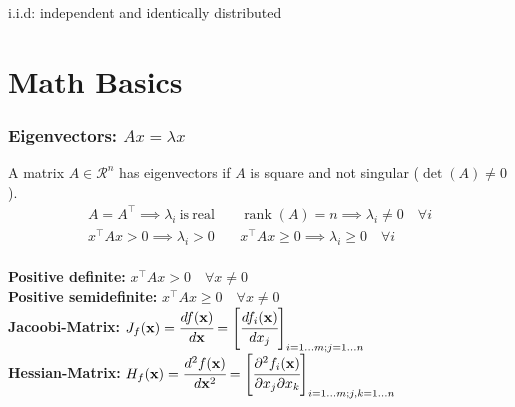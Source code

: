 \begin{mdframed}[style=redbox]
  i.i.d: independent and identically distributed
\end{mdframed}

\section{Math Basics}
\begin{mdframed}[style=eqbox]
\subsubsection*{Eigenvectors: \(A x = \lambda x\)}
A matrix $A \in \mathcal R^n$ has eigenvectors if $A$ is square and not singular (\(\det (A) \neq 0\)).
\vspace*{-4pt}\begin{align*}
  A = A^\top \implies \lambda_i \mathrm{~is~real~} && \operatorname*{rank}(A) = n \implies \lambda_i \neq 0 \quad \forall i\\
  x^\top A x > 0 \implies \lambda_i > 0 && x^\top A x \geq 0 \implies \lambda_i \geq 0 \quad \forall i
\end{align*}\vspace*{-16pt}\\
\textbf{Positive definite:} \(x^\top A x > 0 \quad \forall x \neq 0\)\\
\textbf{Positive semidefinite:} \(x^\top A x \geq 0 \quad \forall x \neq 0\)\\
\textbf{Jacoobi-Matrix:} \(J_f(\mathbf x) = \cfrac{d f(\mathbf x)}{d\mathbf x} = \left[\cfrac{df_i(\mathbf x)}{dx_j}\right]_{i = 1\dots m; j = 1\dots n}\)\\
\textbf{Hessian-Matrix:} \(H_f(\mathbf x) = \cfrac{d^2 f(\mathbf x)}{d\mathbf x^2} = \left[\cfrac{\partial^2 f_i(\mathbf x)}{\partial x_j\partial x_k}\right]_{i = 1\dots m; j, k = 1\dots n}\)
\end{mdframed}
%

